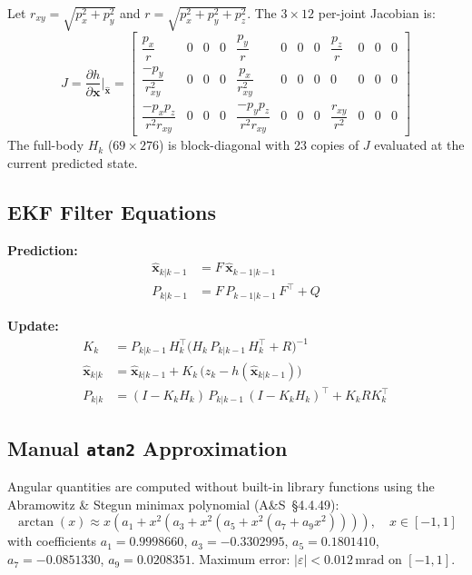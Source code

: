 \documentclass[11pt, a4paper]{article}
\begin{document}
Let $r_{xy} = \sqrt{p_x^2+p_y^2}$ and $r = \sqrt{p_x^2+p_y^2+p_z^2}$.
The $3\times12$ per-joint Jacobian is:
\begin{equation}
  J = \frac{\partial h}{\partial \mathbf{x}}\bigg|_{\hat{\mathbf{x}}}
  =
  \begin{bmatrix}
    \dfrac{p_x}{r}           & 0 & 0 & 0 &
    \dfrac{p_y}{r}           & 0 & 0 & 0 &
    \dfrac{p_z}{r}           & 0 & 0 & 0 \\[8pt]
    \dfrac{-p_y}{r_{xy}^2}   & 0 & 0 & 0 &
    \dfrac{p_x}{r_{xy}^2}    & 0 & 0 & 0 &
    0 & 0 & 0 & 0 \\[8pt]
    \dfrac{-p_xp_z}{r^2r_{xy}} & 0 & 0 & 0 &
    \dfrac{-p_yp_z}{r^2r_{xy}} & 0 & 0 & 0 &
    \dfrac{r_{xy}}{r^2}      & 0 & 0 & 0
  \end{bmatrix}
\end{equation}
The full-body $H_k$ ($69\times276$) is block-diagonal with 23 copies of $J$ evaluated
at the current predicted state.

\subsection{EKF Filter Equations}

\textbf{Prediction:}
\begin{align}
  \hat{\mathbf{x}}_{k|k-1} &= F\,\hat{\mathbf{x}}_{k-1|k-1} \\
  P_{k|k-1}                &= F\,P_{k-1|k-1}\,F^\top + Q
\end{align}

\textbf{Update:}
\begin{align}
  K_k &= P_{k|k-1}\,H_k^\top
        \bigl(H_k\,P_{k|k-1}\,H_k^\top + R\bigr)^{-1} \\
  \hat{\mathbf{x}}_{k|k} &=
        \hat{\mathbf{x}}_{k|k-1}
        + K_k\,\bigl(z_k - h(\hat{\mathbf{x}}_{k|k-1})\bigr) \\
  P_{k|k} &= (I - K_kH_k)\,P_{k|k-1}\,(I - K_kH_k)^\top
           + K_k R K_k^\top
\end{align}

\subsection{Manual \texttt{atan2} Approximation}

Angular quantities are computed without built-in library functions using the
Abramowitz \& Stegun minimax polynomial (A\&S~\S4.4.49):
\begin{equation}
  \arctan(x) \approx
  x\!\left(a_1 + x^2\!\left(a_3 + x^2\!\left(a_5
  + x^2\!\left(a_7 + a_9 x^2\right)\right)\right)\right),
  \quad x \in [-1,1]
\end{equation}
with coefficients $a_1 = 0.9998660$, $a_3 = -0.3302995$, $a_5 = 0.1801410$,
$a_7 = -0.0851330$, $a_9 = 0.0208351$.
Maximum error: $|\varepsilon| < 0.012\,\text{mrad}$ on $[-1,1]$.
\end{document}
